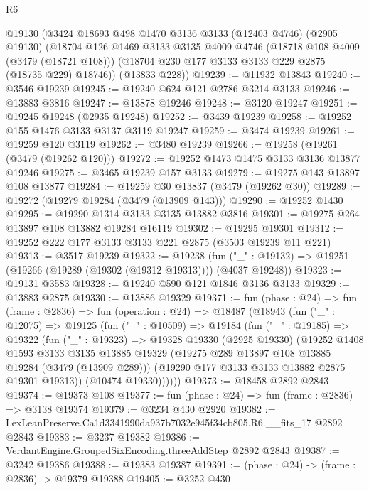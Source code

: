 \begin{lexlean}{R6}
\begin{coremodule}
    @19130
    (@3424
      @18693
      @498
      @1470
      @3136
      @3133
      (@12403 @4746)
      (@2905 @19130)
      (@18704
        @126
        @1469
        @3133
        @3135
        @4009
        @4746
        (@18718 @108 @4009 (@3479 (@18721 @108)))
        (@18704 @230 @177 @3133 @3133 @229 @2875 (@18735 @229) @18746))
      (@13833 @228))
@19239 := @11932 @13843
@19240 := @3546 @19239
@19245 := @19240 @624 @121 @2786 @3214 @3133
@19246 := @13883 @3816
@19247 := @13878 @19246
@19248 := @3120 @19247
@19251 := @19245 @19248 (@2935 @19248)
@19252 := @3439 @19239
@19258 := @19252 @155 @1476 @3133 @3137 @3119 @19247
@19259 := @3474 @19239
@19261 := @19259 @120 @3119
@19262 := @3480 @19239
@19266 := @19258 (@19261 (@3479 (@19262 @120)))
@19272 := @19252 @1473 @1475 @3133 @3136 @13877 @19246
@19275 := @3465 @19239 @157 @3133
@19279 := @19275 @143 @13897 @108 @13877
@19284 := @19259 @30 @13837 (@3479 (@19262 @30))
@19289 := @19272 (@19279 @19284 (@3479 (@13909 @143)))
@19290 := @19252 @1430
@19295 := @19290 @1314 @3133 @3135 @13882 @3816
@19301 := @19275 @264 @13897 @108 @13882 @19284 @16119
@19302 := @19295 @19301
@19312 := @19252 @222 @177 @3133 @3133 @221 @2875 (@3503 @19239 @11 @221)
@19313 := @3517 @19239
@19322 := @19238
    (fun ("_" : @19132) => @19251 (@19266 (@19289 (@19302 (@19312 @19313)))) (@4037 @19248))
@19323 := @19131 @3583
@19328 := @19240 @590 @121 @1846 @3136 @3133
@19329 := @13883 @2875
@19330 := @13886 @19329
@19371 := fun (phase : @24) =>
  fun (frame : @2836) =>
  fun (operation : @24) =>
  @18487
    (@18943
      (fun ("_" : @12075) =>
      @19125
        (fun ("_" : @10509) =>
        @19184
          (fun ("_" : @19185) =>
          @19322
            (fun ("_" : @19323) =>
            @19328
              @19330
              (@2925 @19330)
              (@19252
                @1408
                @1593
                @3133
                @3135
                @13885
                @19329
                (@19275 @289 @13897 @108 @13885 @19284 (@3479 (@13909 @289)))
                (@19290 @177 @3133 @3133 @13882 @2875 @19301 @19313))
              (@10474 @19330))))))
@19373 := @18458 @2892 @2843
@19374 := @19373 @108
@19377 := fun (phase : @24) => fun (frame : @2836) => @3138 @19374
@19379 := @3234 @430 @2920
@19382 := LexLeanPreserve.Ca1d3341990da937b7032e945f34cb805.R6.__fits_17 @2892 @2843
@19383 := @3237 @19382
@19386 := VerdantEngine.GroupedSixEncoding.threeAddStep @2892 @2843
@19387 := @3242 @19386
@19388 := @19383 @19387
@19391 := (phase : @24) -> (frame : @2836) -> @19379 @19388
@19405 := @3252
    @430

\end{coremodule}
\end{lexlean}
